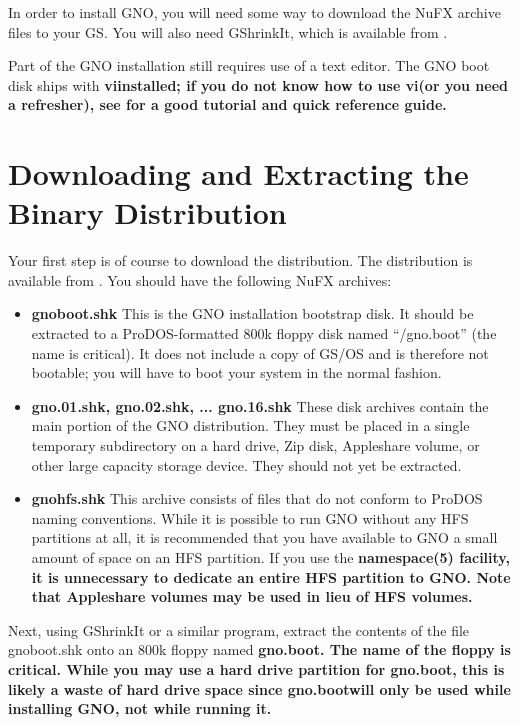 \documentclass{report}
\begin{document}
In order to install GNO, you will need some way to download the NuFX
archive files to your GS.  You will also need GShrinkIt, which is available
from 
.

Part of the GNO installation still requires use of a text editor.  The
GNO boot disk ships with \bf vi\rm installed;
if you do not know how to use \bf vi\rm (or you need a refresher), see 
for a good tutorial and quick reference guide.

\section{Downloading and Extracting the Binary Distribution}

Your first step is of course to download the distribution.
The distribution is available from 
.
You should have the following NuFX archives:

\begin{itemize}

\item{\bf gnoboot.shk\rm}
This is the GNO installation bootstrap disk.  It should be extracted to
a ProDOS-formatted 800k floppy disk named ``/gno.boot'' (the name is
critical).  It does not include a copy of GS/OS and is
therefore not bootable; you will have to boot your system in the normal
fashion.

\item{\bf gno.01.shk\rm, \bf gno.02.shk\rm, ... \bf gno.16.shk\rm}
These disk archives contain the main portion of the GNO distribution.
They must be placed in a single temporary subdirectory on a hard drive,
Zip disk, Appleshare volume, or other large capacity storage device.
They should not yet be extracted.

\item{\bf gnohfs.shk\rm}
This archive consists of files that do not conform to ProDOS naming 
conventions.  While it is possible to run GNO without any HFS partitions
at all, it is recommended that you have available to GNO a small amount
of space on an HFS partition.  If you use the \bf namespace\rm(5) facility,
it is unnecessary to dedicate an entire HFS partition to GNO.
Note that Appleshare volumes may be used in lieu of HFS volumes.

\end{itemize}

Next, using GShrinkIt or a similar program, extract the contents of the
file gnoboot.shk onto an 800k floppy named \bf gno.boot\rm.  
The name of the floppy is critical.  While you may use a hard drive 
partition for \bf gno.boot\rm, this is likely a waste of hard drive space
since \bf gno.boot\rm will only be used while installing GNO, not while
running it.
\end{document}
